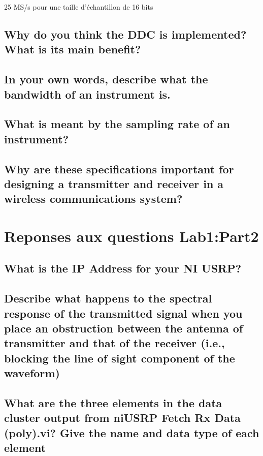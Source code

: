 \documentclass[11pt]{article}
\begin{document}
25 MS/s pour une taille d'échantillon de 16 bits

\subsection{Why do you think the DDC is implemented? What is its main benefit?}

\subsection{In your own words, describe what the bandwidth of an instrument is.}

\subsection{What is meant by the sampling rate of an instrument?}

\subsection{Why are these specifications important for designing a transmitter and
receiver in a wireless communications system?}

\section{Reponses aux questions Lab1:Part2}

\subsection{What is the IP Address for your NI USRP?}
\subsection{Describe what happens to the spectral response of the transmitted signal
when you place an obstruction between the antenna of transmitter and
that of the receiver (i.e., blocking the line of sight component of the
waveform)}
\subsection{What are the three elements in the data cluster output from niUSRP
Fetch Rx Data (poly).vi? Give the name and data type of each element}
\end{document}
